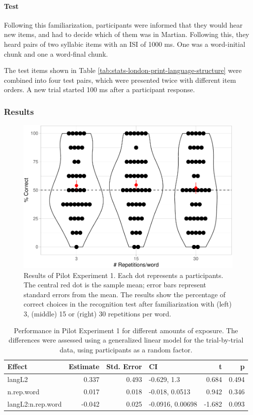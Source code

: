 \documentclass[
]{article}
\begin{document}
\paragraph{Test}\label{test}

Following this familiarization, participants were informed that they
would hear new items, and had to decide which of them was in Martian.
Following this, they heard pairs of two syllabic items with an ISI of
1000 ms. One was a word-initial chunk and one a word-final chunk.

The test items shown in Table
\ref{tab:stats-london-print-language-structure} were combined into four
test pairs, which were presented twice with different item orders. A new
trial started 100 ms after a participant response.

\subsubsection{Results}\label{results-1}

\begin{figure}

{\centering \includegraphics[width=0.8\linewidth]{segmentation_recall_combined_for_revision3_files/figure-latex/bcn-plot-stats-1} 

}

\caption{Results of Pilot Experiment 1. Each dot represents a participants. The central red dot is the sample mean; error bars represent standard errors from the mean. The results show the percentage of correct choices in the recognition test after familiarization with (left) 3, (middle) 15  or (right) 30 repetitions per word.}\label{fig:bcn-plot-stats}
\end{figure}

\begin{longtable}[t]{lrrlrr}
\caption{\label{tab:bcn-glmm-print}Performance in Pilot Experiment 1 for different amounts of exposure. The differences were assessed using a generalized linear model for the trial-by-trial data, using participants as a random factor.}\\
\toprule
Effect & Estimate & Std. Error & CI & t & p\\
\midrule
langL2 & 0.337 & 0.493 & -0.629, 1.3 & 0.684 & 0.494\\
n.rep.word & 0.017 & 0.018 & -0.018, 0.0513 & 0.942 & 0.346\\
langL2:n.rep.word & -0.042 & 0.025 & -0.0916, 0.00698 & -1.682 & 0.093\\
\bottomrule
\end{longtable}
\end{document}
